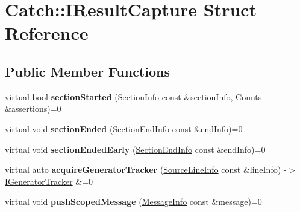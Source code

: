 \hypertarget{structCatch_1_1IResultCapture}{}\section{Catch\+:\+:I\+Result\+Capture Struct Reference}
\label{structCatch_1_1IResultCapture}
\subsection*{Public Member Functions}
\begin{DoxyCompactItemize}
\item 
\mbox{\label{structCatch_1_1IResultCapture_a5b76ed52badcb64cf374202e12b81a03}} 
virtual bool {\bfseries section\+Started} (\hyperlink{structCatch_1_1SectionInfo}{Section\+Info} const \&section\+Info, \hyperlink{structCatch_1_1Counts}{Counts} \&assertions)=0
\item 
\mbox{\label{structCatch_1_1IResultCapture_a4e152bc43dc0933684e31fa67a58195d}} 
virtual void {\bfseries section\+Ended} (\hyperlink{structCatch_1_1SectionEndInfo}{Section\+End\+Info} const \&end\+Info)=0
\item 
\mbox{\label{structCatch_1_1IResultCapture_afcc71eef8ca821ae132cced4a2be6988}} 
virtual void {\bfseries section\+Ended\+Early} (\hyperlink{structCatch_1_1SectionEndInfo}{Section\+End\+Info} const \&end\+Info)=0
\item 
\mbox{\label{structCatch_1_1IResultCapture_ab020d111e29ad1cabe1227dcfda712ef}} 
virtual auto {\bfseries acquire\+Generator\+Tracker} (\hyperlink{structCatch_1_1SourceLineInfo}{Source\+Line\+Info} const \&line\+Info) -\/$>$ \hyperlink{structCatch_1_1IGeneratorTracker}{I\+Generator\+Tracker} \&=0
\item 
\mbox{\label{structCatch_1_1IResultCapture_a91d154c1e087e383dcde5aad95cb6a05}} 
virtual void {\bfseries push\+Scoped\+Message} (\hyperlink{structCatch_1_1MessageInfo}{Message\+Info} const \&message)=0
\item 
\mbox{\label{structCatch_1_1IResultCapture_a42bcb13276706bf8c3ce081ce16d37fd}} 

\end{DoxyCompactItemize}
